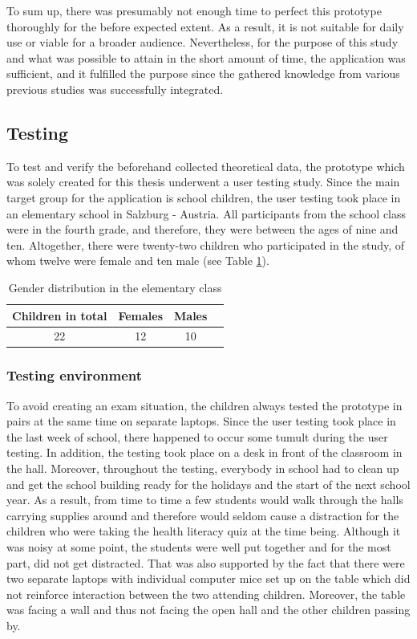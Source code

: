 To sum up, there was presumably not enough time to perfect this prototype thoroughly for the before expected extent. As a result, it is not suitable for daily use or viable for a broader audience. Nevertheless, for the purpose of this study and what was possible to attain in the short amount of time, the application was sufficient, and it fulfilled the purpose since the gathered knowledge from various previous studies was successfully integrated.

\subsection{Testing}
\label{subsection:Testing}
To test and verify the beforehand collected theoretical data, the prototype which was solely created for this thesis underwent a user testing study. Since the main target group for the application is school children, the user testing took place in an elementary school in Salzburg - Austria. All participants from the school class were in the fourth grade, and therefore, they were between the ages of nine and ten. Altogether, there were twenty-two children who participated in the study, of whom twelve were female and ten male (see Table \ref{table:GenderRatio}). 

\begin{table}
    \centering
    \begin{tabular}{ |c|c|c|c| } 
        \hline
        Children in total & Females & Males  \\
        \hline
        22 & 12 & 10 \\ 
        \hline
    \end{tabular}
    \caption{
        Gender distribution in the elementary class
    }
    \label{table:GenderRatio}
\end{table}

\subsubsection{Testing environment}
To avoid creating an exam situation, the children always tested the prototype in pairs at the same time on separate laptops. Since the user testing took place in the last week of school, there happened to occur some tumult during the user testing. In addition, the testing took place on a desk in front of the classroom in the hall. Moreover, throughout the testing, everybody in school had to clean up and get the school building ready for the holidays and the start of the next school year. As a result, from time to time a few students would walk through the halls carrying supplies around and therefore would seldom cause a distraction for the children who were taking the health literacy quiz at the time being. Although it was noisy at some point, the students were well put together and for the most part, did not get distracted. That was also supported by the fact that there were two separate laptops with individual computer mice set up on the table which did not reinforce interaction between the two attending children. Moreover, the table was facing a wall and thus not facing the open hall and the other children passing by.

